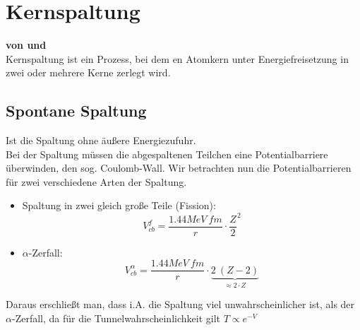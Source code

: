 \documentclass[Ex4_Zusammenfassung.tex]{subfiles}
\begin{document}
\section{Kernspaltung}
\textbf{von \mitsch und \soeren} \\

Kernspaltung ist ein Prozess, bei dem en Atomkern unter Energiefreisetzung in zwei oder mehrere Kerne zerlegt wird.
\subsection{Spontane Spaltung}
Ist die Spaltung ohne äußere Energiezufuhr. \\
Bei der Spaltung müssen  die abgespaltenen Teilchen eine Potentialbarriere überwinden, den sog. Coulomb-Wall.
Wir betrachten nun die Potentialbarrieren für zwei verschiedene Arten der Spaltung.
\begin{itemize}
\item Spaltung in zwei gleich große Teile (Fission): 
		\begin{equation}
		V_{cb}^f = \frac{1.44 MeV \ fm}{r} \cdot \frac{Z}{2}^2
		\end{equation}
\item $\alpha$-Zerfall: 
		\begin{equation}
		V_{cb}^{\alpha} = \frac{1.44 MeV \ fm}{r} \cdot \underbrace{2 \ (Z-2)}_{\approx 2 \cdot Z}
		\end{equation}
\end{itemize}
Daraus erschließt man, dass i.A. die Spaltung viel unwahrscheinlicher ist, als der $\alpha$-Zerfall, da für die Tunnelwahrscheinlichkeit gilt $T \propto e^{-V}$ \\ 
\end{document}

